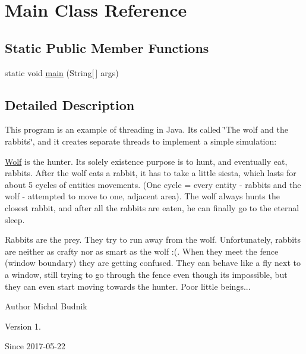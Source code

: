\hypertarget{class_main}{}\section{Main Class Reference}
\label{class_main}
\subsection*{Static Public Member Functions}
\begin{DoxyCompactItemize}
\item 
static void \hyperlink{class_main_a8a5d0f827edddff706cc0e6740d0579a}{main} (String\mbox{[}$\,$\mbox{]} args)
\end{DoxyCompactItemize}


\subsection{Detailed Description}
This program is an example of threading in Java. It\textquotesingle{}s called \char`\"{}\+The wolf and the rabbits\char`\"{}, and it creates separate threads to implement a simple simulation\+:
\begin{DoxyItemize}
\item \hyperlink{class_wolf}{Wolf} is the hunter. It\textquotesingle{}s solely existence purpose is to hunt, and eventually eat, rabbits. After the wolf eats a rabbit, it has to take a little siesta, which lasts for about 5 cycles of entities movements. (One cycle = every entity -\/ rabbits and the wolf -\/ attempted to move to one, adjacent area). The wolf always hunts the closest rabbit, and after all the rabbits are eaten, he can finally go to the eternal sleep.
\item Rabbits are the prey. They try to run away from the wolf. Unfortunately, rabbits are neither as crafty nor as smart as the wolf \+:(. When they meet the fence (window boundary) they are getting confused. They can behave like a fly next to a window, still trying to go through the fence even though it\textquotesingle{}s impossible, but they can even start moving towards the hunter. Poor little beings... \begin{DoxyAuthor}{Author}
Michal Budnik 
\end{DoxyAuthor}
\begin{DoxyVersion}{Version}
1. 
\end{DoxyVersion}
\begin{DoxySince}{Since}
2017-\/05-\/22 
\end{DoxySince}

\end{DoxyItemize}

